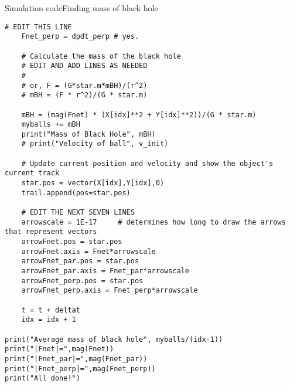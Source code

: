 \begin{frame}[fragile]{Simulation code}{Finding mass of black hole}
\begin{multicols}{2}
\begin{verbatim}
# EDIT THIS LINE
    Fnet_perp = dpdt_perp # yes.

    # Calculate the mass of the black hole 
    # EDIT AND ADD LINES AS NEEDED
    #
    # or, F = (G*star.m*mBH)/(r^2)
    # mBH = (F * r^2)/(G * star.m)
    
    mBH = (mag(Fnet) * (X[idx]**2 + Y[idx]**2))/(G * star.m)
    myballs += mBH
    print("Mass of Black Hole", mBH)
    # print("Velocity of ball", v_init)

    # Update current position and velocity and show the object's current track
    star.pos = vector(X[idx],Y[idx],0)
    trail.append(pos=star.pos)

    # EDIT THE NEXT SEVEN LINES
    arrowscale = 1E-17     # determines how long to draw the arrows that represent vectors
    arrowFnet.pos = star.pos
    arrowFnet.axis = Fnet*arrowscale
    arrowFnet_par.pos = star.pos
    arrowFnet_par.axis = Fnet_par*arrowscale
    arrowFnet_perp.pos = star.pos
    arrowFnet_perp.axis = Fnet_perp*arrowscale
    
    t = t + deltat
    idx = idx + 1

print("Average mass of black hole", myballs/(idx-1))
print("|Fnet|=",mag(Fnet))
print("|Fnet_par|=",mag(Fnet_par))
print("|Fnet_perp|=",mag(Fnet_perp))
print("All done!")
    
\end{verbatim}
\end{multicols}
\end{frame}

